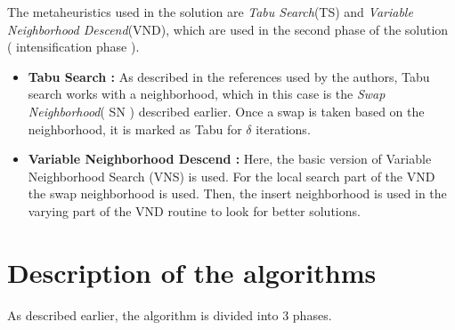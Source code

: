 \documentclass{article}
\begin{document}


The metaheuristics used in the solution are \textit{Tabu Search}(TS) and \textit{Variable Neighborhood Descend}(VND), which are used in the second phase of the solution ( intensification phase ).

\begin{itemize}
\item \textbf{Tabu Search :} As described in the references used by the authors, Tabu search works with a neighborhood, which in this case is the \textit{Swap Neighborhood}( SN ) described earlier. Once a swap is taken based on the neighborhood, it is marked as Tabu for $\delta$ iterations.
\item \textbf{Variable Neighborhood Descend :} Here, the basic version of Variable Neighborhood Search (VNS) is used. For the local search part of the VND the swap neighborhood is used. Then, the insert neighborhood is used in the varying part of the VND routine to look for better solutions.
\end{itemize}


\section{Description of the algorithms}\label{sec:algorithms}%

As described earlier, the algorithm is divided into 3 phases.
\end{document}
